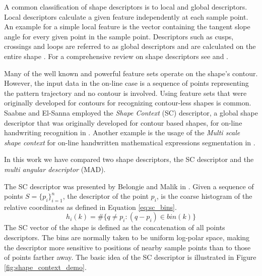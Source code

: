 \iftoggle{edit-mode}{\hspace{0pt}\marginpar{Shape descriptors types}}{}
A common classification of shape descriptors is to local and global descriptors. 
Local descriptors calculate a given feature independently at each sample point. 
An example for a simple local feature is the vector containing the tangent slope angle for every given point in the sample point. 
Descriptors such as cusps, crossings and loops are referred to as global descriptors and are calculated on the entire shape \cite{hu1997combining}. 
For a comprehensive review on shape descriptors see \cite{zhang2004review} and \cite{yang2008survey}.

\iftoggle{edit-mode}{\hspace{0pt}\marginpar{Using off-line shape descriptors for on-line HWR}}{}
Many of the well known and powerful feature sets operate on the shape's contour.  
However, the input data in the on-line case is a sequence of points representing the pattern trajectory and no contour is involved. 
Using feature sets that were originally developed for contours for recognizing contour-less shapes is common. 
Saabne and El-Sanna employed the \emph{Shape Context} (SC) descriptor, a global shape descriptor that was originally developed for contour based shapes, for on-line handwriting recognition in \cite{saabni2009hierarchical}. 
Another example is the usage of the \emph{Multi scale shape context} for on-line handwritten mathematical expressions segmentation in \cite{husegmenting}. 

\iftoggle{edit-mode}{\hspace{0pt}\marginpar{Selected Descriptors}}{}
In this work we have compared two shape descriptors, the SC descriptor and the \emph{multi angular descriptor} (MAD). 

\iftoggle{edit-mode}{\hspace{0pt}\marginpar{Shape Context}}{}
The SC descriptor was presented by Belongie and Malik in \cite{belongie2002shape}.
Given a sequence of points $S=\{p_i\}_{i=1}^n$, the descriptor of the point ${p_i}$, is the coarse histogram of the relative coordinates as defined in Equation \ref{eq:sc_bins}.
\begin{equation}
{h_i}(k) = \# \{q \ne p_i:(q - p_i) \in bin(k) \}
\label{eq:sc_bins}
\end{equation}
The SC vector of the shape is defined as the concatenation of all points descriptors.
The bins are normally taken to be uniform log-polar space, making the descriptor more sensitive to positions of nearby sample points than to those of points farther away. 
The basic idea of the SC descriptor is illustrated in Figure \ref{fig:shape_context_demo}. 

